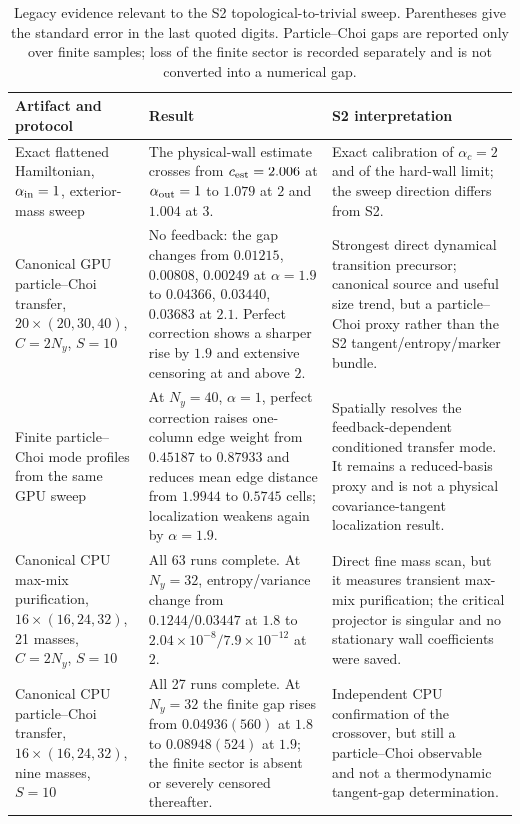\documentclass[aps,prx,twocolumn,floatfix,nofootinbib,superscriptaddress,longbibliography]{revtex4-2}
\newcommand{\campaignTableSetup}{%
  \footnotesize
  \setlength{\tabcolsep}{4pt}%
  \renewcommand{\arraystretch}{1.12}%
}
\begin{document}
\begin{table}[t]
\campaignTableSetup
\caption{Legacy evidence relevant to the S2 topological-to-trivial sweep.  Parentheses give
the standard error in the last quoted digits.  Particle--Choi gaps are reported only over
finite samples; loss of the finite sector is recorded separately and is not converted into
a numerical gap.}
\label{tab:S2-legacy}
\begin{tabularx}{\textwidth}{@{}L{0.75}L{1.10}L{1.15}@{}}
\toprule
Artifact and protocol & Result & S2 interpretation \\
\midrule
Exact flattened Hamiltonian, $\alpha_{\rm in}=1$, exterior-mass sweep
& The physical-wall estimate crosses from $c_{\rm est}=2.006$ at
$\alpha_{\rm out}=1$ to $1.079$ at $2$ and $1.004$ at $3$.
& Exact calibration of $\alpha_c=2$ and of the hard-wall limit; the sweep direction differs
from S2. \\
Canonical GPU particle--Choi transfer, $20\times(20,30,40)$, $C=2N_y$, $S=10$
& No feedback: the gap changes from $0.01215$, $0.00808$, $0.00249$ at $\alpha=1.9$ to
$0.04366$, $0.03440$, $0.03683$ at $2.1$.  Perfect correction shows a sharper rise by
$1.9$ and extensive censoring at and above $2$.
& Strongest direct dynamical transition precursor; canonical source and useful size trend,
but a particle--Choi proxy rather than the S2 tangent/entropy/marker bundle. \\
Finite particle--Choi mode profiles from the same GPU sweep
& At $N_y=40$, $\alpha=1$, perfect correction raises one-column edge weight from
$0.45187$ to $0.87933$ and reduces mean edge distance from $1.9944$ to $0.5745$ cells;
localization weakens again by $\alpha=1.9$.
& Spatially resolves the feedback-dependent conditioned transfer mode.  It remains a
reduced-basis proxy and is not a physical covariance-tangent localization result. \\
Canonical CPU max-mix purification, $16\times(16,24,32)$, 21 masses, $C=2N_y$, $S=10$
& All 63 runs complete.  At $N_y=32$, entropy/variance change from $0.1244/0.03447$ at
$1.8$ to $2.04\times10^{-8}/7.9\times10^{-12}$ at $2$.
& Direct fine mass scan, but it measures transient max-mix purification; the critical
projector is singular and no stationary wall coefficients were saved. \\
Canonical CPU particle--Choi transfer, $16\times(16,24,32)$, nine masses, $S=10$
& All 27 runs complete.  At $N_y=32$ the finite gap rises from $0.04936(560)$ at $1.8$ to
$0.08948(524)$ at $1.9$; the finite sector is absent or severely censored thereafter.
& Independent CPU confirmation of the crossover, but still a particle--Choi observable and
not a thermodynamic tangent-gap determination. \\
\bottomrule
\end{tabularx}
\end{table}
\end{document}
